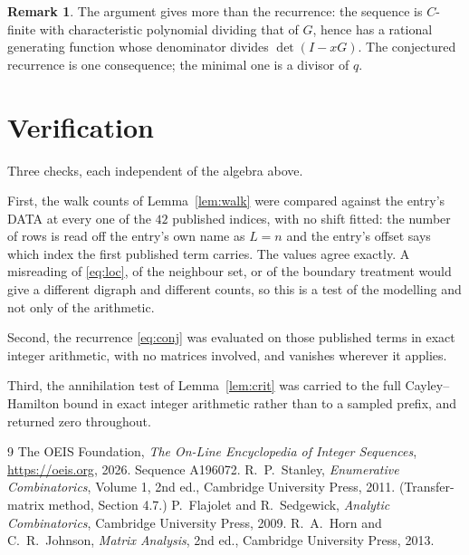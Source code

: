 \documentclass[11pt,a4paper]{article}
\theoremstyle{plain}
\theoremstyle{definition}
\newtheorem{remark}[theorem]{Remark}
\begin{document}
\begin{remark}
The argument gives more than the recurrence: the sequence is $C$-finite with characteristic
polynomial dividing that of $G$, hence has a rational generating function whose denominator
divides $\det(I-xG)$. The conjectured recurrence is one consequence; the minimal one is a
divisor of $q$.
\end{remark}

\section{Verification}

Three checks, each independent of the algebra above.

First, the walk counts of Lemma~\ref{lem:walk} were compared against the entry's DATA at
every one of the $42$ published indices, with no shift fitted: the number of rows is
read off the entry's own name as $L=n$ and the entry's offset says which index the first
published term carries. The values agree exactly. A misreading of \eqref{eq:loc}, of the
neighbour set, or of the boundary treatment would give a different digraph and different
counts, so this is a test of the modelling and not only of the arithmetic.

Second, the recurrence \eqref{eq:conj} was evaluated on those published terms in exact
integer arithmetic, with no matrices involved, and vanishes wherever it applies.

Third, the annihilation test of Lemma~\ref{lem:crit} was carried to the full
Cayley--Hamilton bound in exact integer arithmetic rather than to a sampled prefix, and
returned zero throughout.

\begin{thebibliography}{9}
 The OEIS Foundation, \emph{The On-Line Encyclopedia of Integer
Sequences}, \url{https://oeis.org}, 2026. Sequence A196072.
 R.~P.~Stanley, \emph{Enumerative Combinatorics}, Volume 1, 2nd ed.,
Cambridge University Press, 2011. (Transfer-matrix method, Section 4.7.)
 P.~Flajolet and R.~Sedgewick, \emph{Analytic Combinatorics}, Cambridge
University Press, 2009.
 R.~A.~Horn and C.~R.~Johnson, \emph{Matrix Analysis}, 2nd ed., Cambridge
University Press, 2013.
\end{thebibliography}
\end{document}

